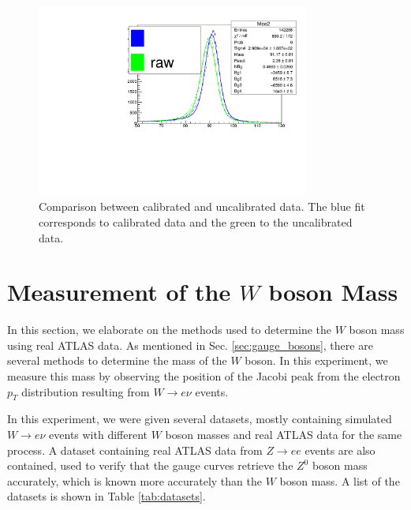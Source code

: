 \documentclass[a4paper]{report}
\numberwithin{equation}{section}
\begin{document}
\begin{figure}[htpb]
    \centering
    \includegraphics[width=0.8\textwidth]{calib_compare}
    \caption{Comparison between calibrated and uncalibrated data. The blue fit corresponds to calibrated data and the green to the uncalibrated data.}
    \label{fig:calib-compare}
\end{figure}

\chapter{Measurement of the $W$ boson Mass} \label{chap:wboson}

In this section, we elaborate on the methods used to determine the $W$ boson mass using real ATLAS data. As mentioned in Sec. 
\ref{sec:gauge_bosons}, there are several methods to determine the mass of the $W$ boson. In this experiment, we measure this 
mass by observing the position of the Jacobi peak from the electron $p_T$ distribution resulting from $W \rightarrow e\nu$ 
events. \par 

In this experiment, we were given several datasets, mostly containing simulated $W \rightarrow e\nu$ events with 
different $W$ boson masses and real ATLAS data for the same process. A dataset containing real ATLAS data 
from $Z \rightarrow ee$ events are also contained, used to verify that the gauge curves retrieve the $Z^0$ boson mass accurately, which 
is known more accurately than the $W$ boson mass. A list of the datasets is shown in Table \ref{tab:datasets}. 
\end{document}
